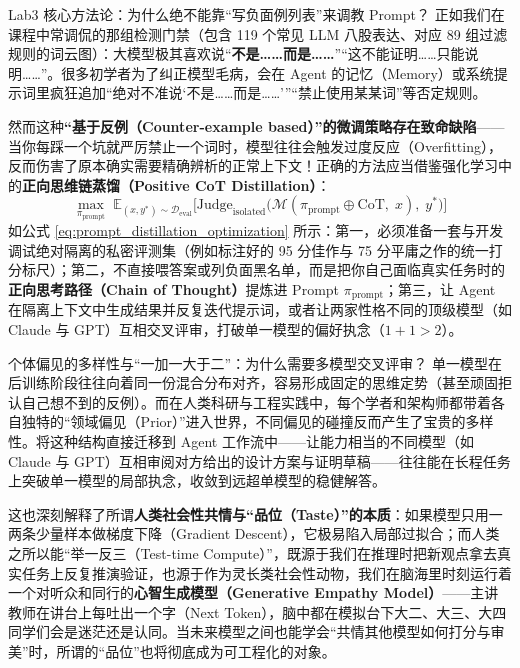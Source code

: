 \documentclass[a4paper]{article}
\begin{document}
\begin{practicebox}{Lab3 核心方法论：为什么绝不能靠“写负面例列表”来调教 Prompt？}
正如我们在课程中常调侃的那组检测门禁（包含 119 个常见 LLM 八股表达、对应 89 组过滤规则的词云图）：大模型极其喜欢说“\textbf{不是……而是……}”“这不能证明……只能说明……”。很多初学者为了纠正模型毛病，会在 Agent 的记忆（Memory）或系统提示词里疯狂追加“绝对不准说‘不是……而是……’”“禁止使用某某词”等否定规则。

然而这种\textbf{“基于反例（Counter-example based）”的微调策略存在致命缺陷}——当你每踩一个坑就严厉禁止一个词时，模型往往会触发过度反应（Overfitting），反而伤害了原本确实需要精确辨析的正常上下文！正确的方法应当借鉴强化学习中的\textbf{正向思维链蒸馏（Positive CoT Distillation）}：
\begin{equation}
\max_{\pi_{\text{prompt}}}\; \mathbb{E}_{(x, y^*) \sim \mathcal{D}_{\text{eval}}} \Big[ \mathrm{Judge}_{\text{isolated}}\big( \mathcal{M}(\pi_{\text{prompt}} \oplus \mathrm{CoT},\; x),\; y^* \big) \Big]
\label{eq:prompt_distillation_optimization}
\end{equation}
如公式 \eqref{eq:prompt_distillation_optimization} 所示：第一，必须准备一套与开发调试绝对隔离的私密评测集（例如标注好的 95 分佳作与 75 分平庸之作的统一打分标尺）；第二，不直接喂答案或列负面黑名单，而是把你自己面临真实任务时的\textbf{正向思考路径（Chain of Thought）}提炼进 Prompt $\pi_{\text{prompt}}$；第三，让 Agent 在隔离上下文中生成结果并反复迭代提示词，或者让两家性格不同的顶级模型（如 Claude 与 GPT）互相交叉评审，打破单一模型的偏好执念（$1 + 1 > 2$）。
\end{practicebox}

\begin{knowledgebox}{个体偏见的多样性与“一加一大于二”：为什么需要多模型交叉评审？}
单一模型在后训练阶段往往向着同一份混合分布对齐，容易形成固定的思维定势（甚至顽固拒认自己想不到的反例）。而在人类科研与工程实践中，每个学者和架构师都带着各自独特的“领域偏见（Prior）”进入世界，不同偏见的碰撞反而产生了宝贵的多样性。将这种结构直接迁移到 Agent 工作流中——让能力相当的不同模型（如 Claude 与 GPT）互相审阅对方给出的设计方案与证明草稿——往往能在长程任务上突破单一模型的局部执念，收敛到远超单模型的稳健解答。
\end{knowledgebox}

这也深刻解释了所谓\textbf{人类社会性共情与“品位（Taste）”的本质}：如果模型只用一两条少量样本做梯度下降（Gradient Descent），它极易陷入局部过拟合；而人类之所以能“举一反三（Test-time Compute）”，既源于我们在推理时把新观点拿去真实任务上反复推演验证，也源于作为灵长类社会性动物，我们在脑海里时刻运行着一个对听众和同行的\textbf{心智生成模型（Generative Empathy Model）}——主讲教师在讲台上每吐出一个字（Next Token），脑中都在模拟台下大二、大三、大四同学们会是迷茫还是认同。当未来模型之间也能学会“共情其他模型如何打分与审美”时，所谓的“品位”也将彻底成为可工程化的对象。
\end{document}
